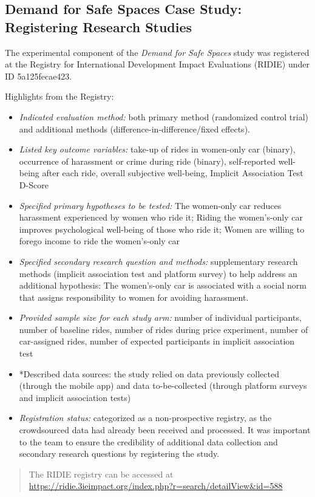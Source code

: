 \documentclass[
]{book}
\providecommand{\tightlist}{%
  \setlength{\itemsep}{0pt}\setlength{\parskip}{0pt}}
\begin{document}
\begin{ex}
\hypertarget{demand-for-safe-spaces-case-study-registering-research-studies}{%
\subsection{Demand for Safe Spaces Case Study: Registering Research Studies}\label{demand-for-safe-spaces-case-study-registering-research-studies}}

The experimental component of the \emph{Demand for Safe Spaces} study was registered at the Registry for International Development Impact Evaluations (RIDIE) under ID 5a125fecae423.

Highlights from the Registry:

\begin{itemize}
\tightlist
\item
  \emph{Indicated evaluation method:} both primary method (randomized control trial) and additional methods (difference-in-difference/fixed effects).
\item
  \emph{Listed key outcome variables:} take-up of rides in women-only car (binary), occurrence of harassment or crime during ride (binary), self-reported well-being after each ride, overall subjective well-being, Implicit Association Test D-Score
\item
  \emph{Specified primary hypotheses to be tested:} The women-only car reduces harassment experienced by women who ride it; Riding the women's-only car improves psychological well-being of those who ride it; Women are willing to forego income to ride the women's-only car
\item
  \emph{Specified secondary research question and methods:} supplementary research methods (implicit association test and platform survey) to help address an additional hypothesis: The women's-only car is associated with a social norm that assigns responsibility to women for avoiding harassment.
\item
  \emph{Provided sample size for each study arm:} number of individual participants, number of baseline rides, number of rides during price experiment, number of car-assigned rides, number of expected participants in implicit association test
\item
  *Described data sources: the study relied on data previously collected (through the mobile app) and data to-be-collected (through platform surveys and implicit association tests)
\item
  \emph{Registration status:} categorized as a non-prospective registry, as the crowdsourced data had already been received and processed. It was important to the team to ensure the credibility of additional data collection and secondary research questions by registering the study.
\end{itemize}

\begin{quote}
The RIDIE registry can be accessed at \url{https://ridie.3ieimpact.org/index.php?r=search/detailView\&id=588}
\end{quote}
\end{ex}
\end{document}
